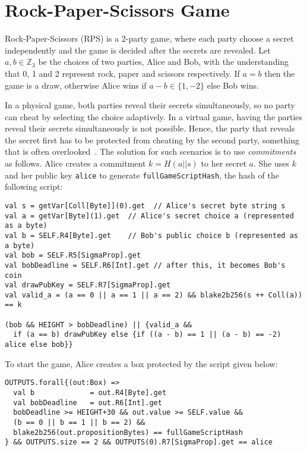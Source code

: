 \documentclass[11pt]{article}
\begin{document}
\section{Rock-Paper-Scissors Game}
\label{rps}

Rock-Paper-Scissors (RPS) is a 2-party game, where each party choose a secret independently and the game is decided after the secrets are revealed. 
Let $a, b\in \mathbb{Z}_3$ be the choices of two parties, Alice and Bob, with the understanding that 0, 1 and 2 represent rock, paper and scissors respectively. If $a = b$ then the game is a draw, otherwise Alice wins if $a-b \in \{1, -2\}$ else Bob wins. 

In a physical game, both parties reveal their secrets simultaneously, so no party can cheat by selecting the choice adaptively. In a virtual game, having the parties reveal their secrets simultaneously is not possible. Hence, the party that reveals the secret first has to be protected from cheating by the second party, something that is often overlooked~\cite{rps15}. The solution for such scenarios is to use {\em commitments} as follows. 
Alice creates a commitment $k=H(a||s)$ to her secret $a$. She uses $k$ and her public key \texttt{alice} to generate \texttt{fullGameScriptHash}, the hash of the following script:

\begin{verbatim}
val s = getVar[Coll[Byte]](0).get  // Alice's secret byte string s
val a = getVar[Byte](1).get  // Alice's secret choice a (represented as a byte)
val b = SELF.R4[Byte].get    // Bob's public choice b (represented as a byte)
val bob = SELF.R5[SigmaProp].get
val bobDeadline = SELF.R6[Int].get // after this, it becomes Bob's coin
val drawPubKey = SELF.R7[SigmaProp].get
val valid_a = (a == 0 || a == 1 || a == 2) && blake2b256(s ++ Coll(a)) == k

(bob && HEIGHT > bobDeadline) || {valid_a &&
  if (a == b) drawPubKey else {if ((a - b) == 1 || (a - b) == -2) alice else bob}}
\end{verbatim}

To start the game, Alice creates a box protected by the script given below:

\begin{verbatim}
OUTPUTS.forall{(out:Box) =>
  val b             = out.R4[Byte].get
  val bobDeadline   = out.R6[Int].get
  bobDeadline >= HEIGHT+30 && out.value >= SELF.value &&
  (b == 0 || b == 1 || b == 2) && 
  blake2b256(out.propositionBytes) == fullGameScriptHash
} && OUTPUTS.size == 2 && OUTPUTS(0).R7[SigmaProp].get == alice 
\end{verbatim}
\end{document}
